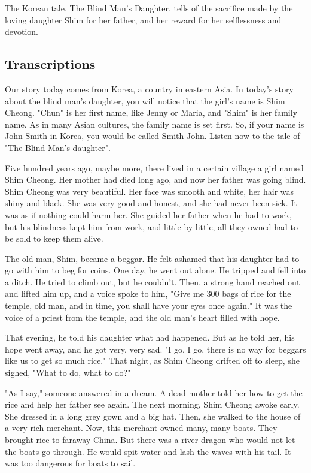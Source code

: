 The Korean tale, The Blind Man's Daughter, tells of the sacrifice made by the loving daughter Shim for her father, and her reward for her selflessness and devotion.

\subsection{Transcriptions}

Our story today comes from Korea, a country in eastern Asia. In today's story about the blind man's daughter, you will notice that the girl's name is Shim Cheong. "Chun" is her first name, like Jenny or Maria, and "Shim" is her family name. As in many Asian cultures, the family name is set first. So, if your name is John Smith in Korea, you would be called Smith John. Listen now to the tale of "The Blind Man's daughter".

Five hundred years ago, maybe more, there lived in a certain village a girl named Shim Cheong. Her mother had died long ago, and now her father was going blind. Shim Cheong was very beautiful. Her face was smooth and white, her hair was shiny and black. She was very good and honest, and she had never been sick. It was as if nothing could harm her. She guided her father when he had to work, but his blindness kept him from work, and little by little, all they owned had to be sold to keep them alive.

The old man, Shim, became a beggar. He felt ashamed that his daughter had to go with him to beg for coins. One day, he went out alone. He tripped and fell into a ditch. He tried to climb out, but he couldn't. Then, a strong hand reached out and lifted him up, and a voice spoke to him, "Give me 300 bags of rice for the temple, old man, and in time, you shall have your eyes once again." It was the voice of a priest from the temple, and the old man's heart filled with hope.

That evening, he told his daughter what had happened. But as he told her, his hope went away, and he got very, very sad. "I go, I go, there is no way for beggars like us to get so much rice." That night, as Shim Cheong drifted off to sleep, she sighed, "What to do, what to do?"

"As I say," someone answered in a dream. A dead mother told her how to get the rice and help her father see again. The next morning, Shim Cheong awoke early. She dressed in a long grey gown and a big hat. Then, she walked to the house of a very rich merchant. Now, this merchant owned many, many boats. They brought rice to faraway China. But there was a river dragon who would not let the boats go through. He would spit water and lash the waves with his tail. It was too dangerous for boats to sail.

